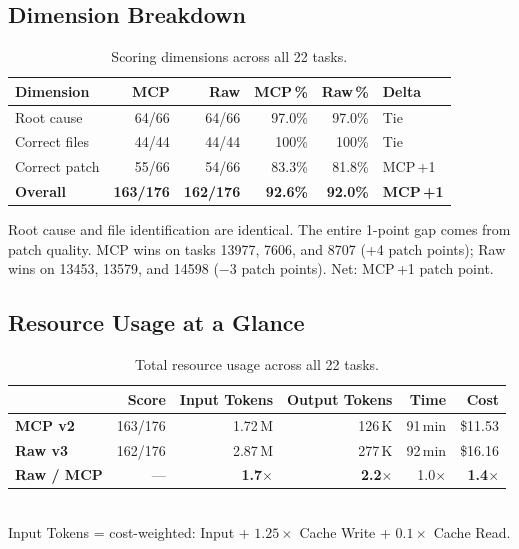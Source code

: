 \subsection{Dimension Breakdown}

\begin{table}[h]
\centering
\caption{Scoring dimensions across all 22 tasks.}\label{tab:dim-cmp}
\begin{tabular}{lrrrrl}
\toprule
\textbf{Dimension} & \textbf{MCP} & \textbf{Raw} & \textbf{MCP\,\%} & \textbf{Raw\,\%} & \textbf{Delta} \\
\midrule
Root cause   & 64/66 & 64/66 & 97.0\% & 97.0\% & Tie \\
Correct files & 44/44 & 44/44 & 100\%  & 100\%  & Tie \\
Correct patch & 55/66 & 54/66 & 83.3\% & 81.8\% & MCP\,+1 \\
\midrule
\textbf{Overall} & \textbf{163/176} & \textbf{162/176} & \textbf{92.6\%} & \textbf{92.0\%} & \textbf{MCP\,+1} \\
\bottomrule
\end{tabular}
\end{table}

\noindent
Root cause and file identification are identical.
The entire 1-point gap comes from patch quality.
MCP wins on tasks 13977, 7606, and 8707 (+4 patch points);
Raw wins on 13453, 13579, and 14598 ($-$3 patch points).
Net: MCP\,+1 patch point.

\subsection{Resource Usage at a Glance}

\begin{table}[h]
\centering
\caption{Total resource usage across all 22 tasks.}\label{tab:resources}
\begin{tabular}{lrrrrr}
\toprule
& \textbf{Score} & \textbf{Input Tokens} & \textbf{Output Tokens} & \textbf{Time} & \textbf{Cost} \\
\midrule
\textbf{MCP v2} & 163/176 & 1.72\,M & 126\,K & 91\,min & \$11.53 \\
\textbf{Raw v3} & 162/176 & 2.87\,M & 277\,K & 92\,min & \$16.16 \\
\midrule
\textbf{Raw / MCP} & ---   & \textbf{1.7$\times$} & \textbf{2.2$\times$} & 1.0$\times$ & \textbf{1.4$\times$} \\
\bottomrule
\end{tabular}
\\[4pt]
{\footnotesize Input Tokens = cost-weighted: Input + $1.25 \times$ Cache Write + $0.1 \times$ Cache Read.}
\end{table}

